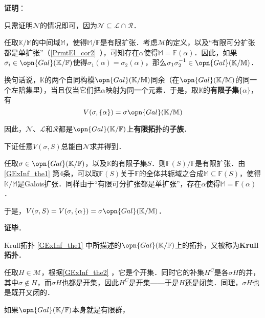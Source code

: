 \textbf{证明}：

只需证明$\mathcal{N}$的情况即可，因为$\mathcal{N}\subseteq \mathcal{L}\cap\mathcal{R}$．

任取$\mathbb{K}/\mathbb{M}$的中间域$\mathbb{M}$，使得$\mathbb{M}/\mathbb{F}$是有限扩张．考虑$\mathcal{M}$的定义，以及“有限可分扩张都是单扩张”（\autoref{PrmtEl_cor2}~），可知存在$\alpha$使得$\mathbb{M}=\mathbb{F}(\alpha)$．因此，如果$\sigma_i\in\opn{Gal}(\mathbb{K}/\mathbb{F})$使得$\sigma_1(\alpha)=\sigma_2(\alpha)$，那么$\sigma_1\sigma_2^{-1}\in\opn{Gal}(\mathbb{K}/\mathbb{M})$．

换句话说，$\mathbb{K}$的两个自同构模$\opn{Gal}(\mathbb{K}/\mathbb{M})$同余（在$\opn{Gal}(\mathbb{K}/\mathbb{M})$的同一个左陪集里），当且仅当它们把$\alpha$映射为同一个元素．于是，取$\mathbb{K}$的\textbf{有限子集}$\{\alpha\}$，有
\begin{equation}
V(\sigma, \{\alpha\}) = \sigma \opn{Gal}(\mathbb{K}/\mathbb{M})
\end{equation}

因此，$\mathcal{N}$、$\mathcal{L}$和$\mathcal{R}$都是$\opn{Gal}(\mathbb{K}/\mathbb{F})$上\textbf{有限拓扑}的\textbf{子族}．

下证任意$V(\sigma, S)$总能由$\mathcal{N}$求并得到．

任取$\sigma\in\opn{Gal}(\mathbb{K}/\mathbb{F})$，以及$\mathbb{K}$的有限子集$S$．则$\mathbb{F}(S)/\mathbb{F}$是有限扩张．由\autoref{GExInf_the1} 第4条，可以取$\mathbb{F}(S)$关于$\mathbb{F}$的全体共轭域之合成$\mathbb{M}\subseteq\mathbb{F}(S)$，使得$\mathbb{K}/\mathbb{M}$是Galois扩张．同样由于“有限可分扩张都是单扩张”，存在$\alpha$使得$\mathbb{M}=\mathbb{F}(\alpha)$．

于是，$V(\sigma, S)=V(\sigma, \{\alpha\})=\sigma \opn{Gal}(\mathbb{K}/\mathbb{M})$．

\textbf{证毕}．

\begin{definition}{Krull拓扑}\label{GExInf_def1}
\autoref{GExInf_the1} 中所描述的$\opn{Gal}(\mathbb{K}/\mathbb{F})$上的拓扑，又被称为\textbf{Krull 拓扑}．
\end{definition}

任取$H\in\mathcal{M}$，根据\autoref{GExInf_the2} ，它是个开集．同时它的补集$H^C$是各$\sigma H$的并，其中$\sigma\not\in H$，而$\sigma H$也都是开集，因此$H^C$是开集——于是$H$还是闭集．同理，$\sigma H$也是既开又闭的．

如果$\opn{Gal}(\mathbb{K}/\mathbb{F})$本身就是有限群，































